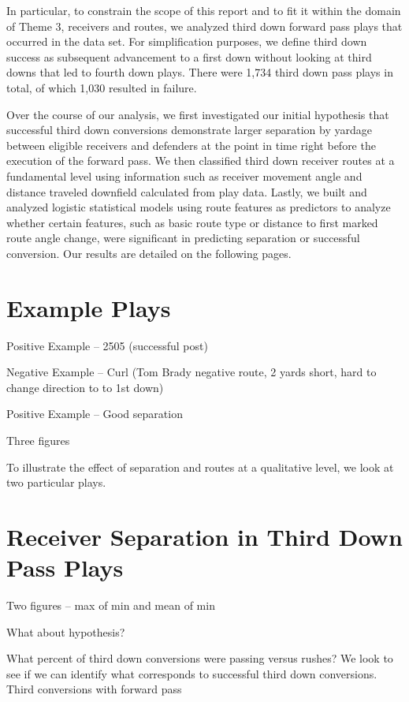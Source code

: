 \documentclass[12pt,letterpaper]{article}
\begin{document}
In particular, to constrain the scope of this report and to fit it within the domain of Theme 3, receivers and routes, we analyzed third down forward pass plays that occurred in the data set. For simplification purposes, we define third down success as subsequent advancement to a first down without looking at third downs that led to fourth down plays. There were 1,734 third down pass plays in total, of which 1,030 resulted in failure.

Over the course of our analysis, we first investigated our initial hypothesis that successful third down conversions demonstrate larger separation by yardage between eligible receivers and defenders at the point in time right before the execution of the forward pass. We then classified third down receiver routes at a fundamental level using information such as receiver movement angle and distance traveled downfield calculated from play data. Lastly, we built and analyzed logistic statistical models using route features as predictors to analyze whether certain features, such as basic route type or distance to first marked route angle change, were significant in predicting separation or successful conversion. Our results are detailed on the following pages.

\section*{Example Plays}

Positive Example -- 2505 (successful post)

Negative Example -- Curl (Tom Brady negative route, 2 yards short, hard to change direction to to 1st down)

Positive Example -- Good separation

Three figures

To illustrate the effect of separation and routes at a qualitative level, we look at two particular plays.

\section*{Receiver Separation in Third Down Pass Plays}

Two figures -- max of min and mean of min

What about hypothesis?

What percent of third down conversions were passing versus rushes? We look to see if we can identify what corresponds to successful third down conversions. Third conversions with forward pass
\end{document}
